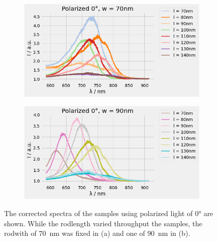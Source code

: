 \begin{figure}
    \centering
    \begin{subfigure}{\textwidth}
        \includegraphics[width=\textwidth]{Bilder/Auswertung/SpektrumPol070.png}
        \caption{ }
        \label{fig:0-70}
    \end{subfigure}
    \hfill
    \begin{subfigure}{\textwidth}
        \includegraphics[width=\textwidth]{Bilder/Auswertung/SpektrumPol090.png}
        \caption{ }
        \label{fig:0-90}
    \end{subfigure}
    \caption{The corrected spectra of the samples using polarized light of \ang{0} are shown. While the rodlength varied throughput the samples, the rodwith of \SI{70}{\nano\meter} was fixed in (a) and one of \SI{90}{\nano\meter} in (b).}
    \label{fig:pol0}
\end{figure}

